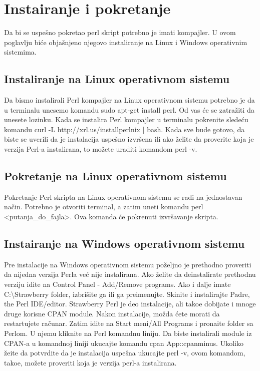 \documentclass[a4paper]{article}
\begin{document}
\section{Instairanje i pokretanje}
Da bi se uspe\v sno pokretao perl skript potrebno je imati kompajler. U ovom poglavlju bi\'ce obja\v snjeno njegovo instaliranje na Linux i Windows operativnim sistemima.

\subsection{Instaliranje na Linux operativnom sistemu}
Da bismo instalirali Perl kompajler na Linux operativnom sistemu potrebno je da u terminalu unesemo komandu sudo apt-get install perl. Od vas \'ce se zatra\v ziti da unesete lozinku. Kada se instalira Perl kompajler u terminalu pokrenite slede\'cu komandu curl -L http://xrl.us/installperlnix | bash. Kada sve bude gotovo, da biste se uverili da je instalacija uspe\v sno izvr\v sena ili ako \v zelite da proverite koja je verzija Perl-a instalirana, to mo\v zete uraditi komandom perl -v.

\subsection{Pokretanje na Linux operativnom sistemu}
Pokretanje Perl skripta na Linux operativnom sistemu se radi na jednostavan na\v cin. Potrebno je otvoriti terminal, a zatim uneti komandu perl <putanja\_do\_fajla>. Ova komanda \'ce pokrenuti izvr\v savanje skripta.

\subsection{Instairanje na Windows operativnom sistemu}
Pre instalacije na Windows operativnom sistemu po\v zeljno je  prethodno proveriti da nijedna verzija Perla ve\'c nije instalirana. Ako \v zelite da deinstalirate prethodnu verziju idite na Control Panel - Add/Remove programs. Ako i dalje imate C:\textbackslash Strawberry folder, izbri\v site ga ili ga preimenujte. Skinite i instalirajte Padre, the Perl IDE/editor\cite{padre}. Strawberry Perl\cite{strawberry} je deo instalacije, ali tako\dj{}e dobijate i mnoge druge korisne CPAN module. Nakon instalacije, mo\v zda \'cete morati da restartujete ra\v cunar. Zatim idite na Start meni/All Programs i prona\dj{}ite folder sa Perlom. U njemu kliknite na Perl komandnu liniju.  Da biste instalirali module iz CPAN-a u komandnoj liniji ukucajte komandu cpan App::cpanminus. Ukoliko \v zeite da  potvrdite da je instalacija uspe\v sna ukucajte perl -v, ovom komandom, tako\dj{}e, mo\v zete proveriti koja je verzija perl-a instalirana.
\end{document}
